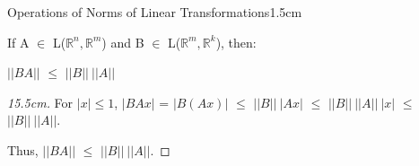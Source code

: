 \begin{ltheorem}{Operations of Norms of Linear Transformations}{1.5cm}
        \item If A $\in$ L($\mathbb{R}^n,\mathbb{R}^m$) and
            B $\in$ L($\mathbb{R}^m,\mathbb{R}^k$), then:

            \hspace{0.5cm}
            $||BA||$ $\leq$ $||B|| \ ||A||$

            \begin{proof}[15.5cm]
                For $|x| \leq 1$, 
                $|BAx|$
                = $|B(Ax)|$
                $\leq$ $||B|| \ |Ax|$
                $\leq$ $||B|| \ ||A|| \ |x|$
                $\leq$ $||B|| \ ||A||$.

                Thus, $||BA||$ $\leq$ $||B|| \ ||A||$.
            \end{proof}
    \end{ltheorem}

    \vspace{0.5cm}




